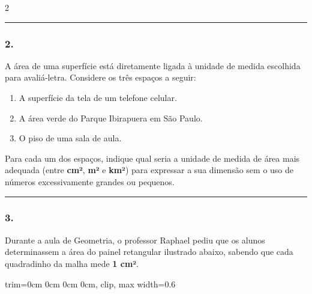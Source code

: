 \documentclass[twoside, 10pt, a4paper]{article}
\newlength{\espacoPreQuestao}\setlength{\espacoPreQuestao}{0.1cm}
\newlength{\espacoQuestao}\setlength{\espacoQuestao}{0.2cm}
\newlength{\espacoAlt}\setlength{\espacoAlt}{0.2cm}
\begin{document}
\begin{multicols*}{2}
\noindent\textcolor{CorLinha}{\rule{\linewidth}{0.5pt}} 
\par\vspace{\espacoPreQuestao}
\subsubsection*{2.} A área de uma superfície está diretamente ligada à unidade de medida escolhida para avaliá-letra. Considere os três espaços a seguir:
\begin{enumerate}[label=\Roman*., itemsep=\espacoAlt]
    \item A superfície da tela de um telefone celular.
    \item A área verde do Parque Ibirapuera em São Paulo.
    \item O piso de uma sala de aula.
\end{enumerate}
Para cada um dos espaços, indique qual seria a unidade de medida de área mais adequada (entre \textbf{cm²}, \textbf{m²} e \textbf{km²}) para expressar a sua dimensão sem o uso de números excessivamente grandes ou pequenos.
\par\vspace{\espacoQuestao}

\noindent\textcolor{CorLinha}{\rule{\linewidth}{0.5pt}}
\par\vspace{\espacoPreQuestao}
\subsubsection*{3.} Durante a aula de Geometria, o professor Raphael pediu que os alunos determinassem a área do painel retangular ilustrado abaixo, sabendo que cada quadradinho da malha mede \textbf{1 cm²}.

\begin{center}
\begin{adjustbox}{trim=0cm 0cm 0cm 0cm, clip, max width=0.6\linewidth}
\end{adjustbox}
\end{center}


\end{multicols*}
\end{document}
